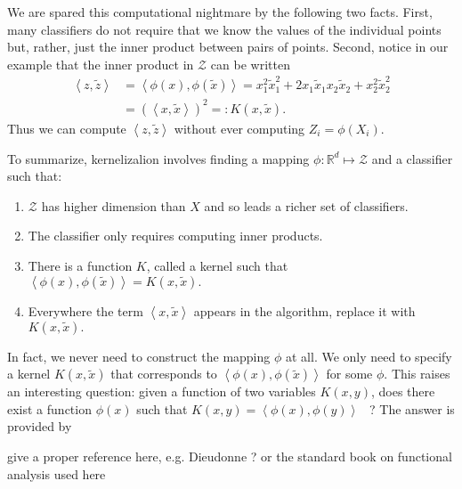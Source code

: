 \documentclass[11pt,twoside]{article}%
\theoremstyle{change}
\newenvironment{quote-env}{\begin{quote}\sffamily }{\end{quote}}
\newenvironment{mycomments-env}[1][Mycomments]{\textbf{#1.} \begin{quote-env} }{ \end{quote-env}  \ \rule{0.5em}{0.5em}}
\begin{document}
\bigskip

We are spared this computational nightmare by the following two facts. First,
many classifiers do not require that we know the values of the individual
points but, rather, just the inner product between pairs of points. Second,
notice in our example that the inner product in $\mathcal{Z}$ can be written%
\begin{align*}
\left\langle z,\tilde{z}\right\rangle  & =\left\langle \phi(x),\phi(\tilde
{x})\right\rangle =x_{1}^{2}\tilde{x}_{1}^{2}+2x_{1}\tilde{x}_{1}x_{2}%
\tilde{x}_{2}+x_{2}^{2}\tilde{x}_{2}^{2}\\
& =\left(  \left\langle x,\tilde{x}\right\rangle \right)  ^{2}=:K\left(
x,\tilde{x}\right)  .
\end{align*}
Thus we can compute $\left\langle z,\tilde{z}\right\rangle $ without ever
computing $Z_{i}=\phi\left(  X_{i}\right)  $.

To summarize, kernelizalion involves finding a mapping $\phi:\mathbb{R}%
^{d}\mapsto\mathcal{Z}$ and a classifier such that:

\begin{enumerate}
\item $\mathcal{Z}$ has higher dimension than $X$ and so leads a richer set of classifiers.

\item The classifier only requires computing inner products.

\item There is a function $K$, called a kernel such that $\left\langle
\phi(x),\phi(\tilde{x})\right\rangle =K\left(  x,\tilde{x}\right)  .$

\item Everywhere the term $\left\langle x,\tilde{x}\right\rangle $ appears in
the algorithm, replace it with $K\left(  x,\tilde{x}\right)  .$
\end{enumerate}

In fact, we never need to construct the mapping $\phi$ at all. We only need to
specify a kernel $K\left(  x,\tilde{x}\right)  $ that corresponds to
$\left\langle \phi(x),\phi(\tilde{x})\right\rangle $ for some $\phi$. This
raises an interesting question: given a function of two variables $K(x,y)$,
does there exist a function $\phi(x)$ such that $K(x,y)=\left\langle
\phi(x),\phi(y)\right\rangle $ \ ? The answer is provided by

\bigskip%
\begin{mycomments}%


\begin{mycomments-env}
give a proper reference here, e.g. Dieudonne ? or the standard book on
functional analysis used here
\end{mycomments-env}%

\end{mycomments}%
\end{document}
